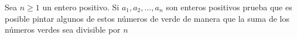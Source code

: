 \begin{problem}
    [\cite{112CP}]
    Sea $n\geq1$ un entero positivo. Si $a_1,a_2, \ldots, a_n$ son enteros positivos
    prueba que es posible pintar algunos de estos n\'umeros de verde de manera 
    que la suma de los n\'umeros verdes sea divisible por $n$
    \label{112CP157}
\end{problem}